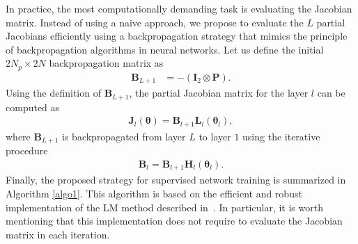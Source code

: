 \documentclass{article}
\begin{document}
In practice, the most computationally demanding task is evaluating the Jacobian matrix. Instead of using a naive approach, we propose to evaluate the $L$ partial Jacobians efficiently using a backpropagation strategy that mimics the principle of backpropagation algorithms in neural networks. Let us define the initial $2N_p\times 2N$ backpropagation matrix as 
\begin{align}
\mathbf{B}_{L+1}&=-\left(\mathbf{I}_2\otimes \mathbf{P}\right).
\end{align}
Using the definition of $\mathbf{B}_{L+1}$, the partial Jacobian matrix for the layer $l$ can be computed as 
\begin{align}
\mathbf{J}_l(\boldsymbol \theta)= \mathbf{B}_{l+1}\mathbf{L}_l(\boldsymbol \theta_l),
\end{align}
where $\mathbf{B}_{L+1}$ is backpropagated from layer $L$ to layer $1$ using the  iterative procedure
\begin{align}
\mathbf{B}_{l} =\mathbf{B}_{l+1}  \mathbf{H}_{l}(\boldsymbol \theta_{l}).
\end{align}
Finally, the proposed strategy for supervised network training is summarized in Algorithm \ref{algo1}. This algorithm is based on the efficient and robust implementation of the LM method described in~\cite{MORE78}. In particular, it is worth mentioning that this implementation does not require to evaluate the Jacobian matrix in each iteration.





%
\end{document}
